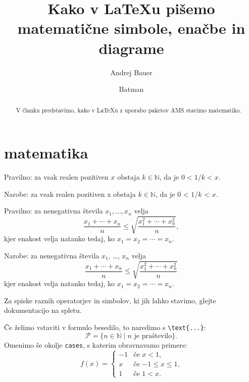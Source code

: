 \documentclass{amsart}
\title[Matematika v {\LaTeX}u]{Kako v {\LaTeX}u pišemo matematične simbole, enačbe in diagrame}
\author{Andrej Bauer}
\author{Batman}
\begin{document}
\maketitle

\begin{abstract}
  V članku predstavimo, kako v {\LaTeX}u z uporabo paketov AMS stavimo matematiko.
\end{abstract}

\section{matematika}

Pravilno: za vsak realen pozitiven $x$ obstaja $k \in \mathbb{N}$, da je $0 < 1/k < x$.

Narobe: za vsak realen pozitiven x obstaja $k \in \mathbb{N}$, da je $0$ < $1/k$ < $x$.


Pravilno: za nenegativna števila $x_1, \ldots, x_n$ velja
%
\[
  \frac{x_1 + \cdots + x_n}{n} \leq
  \sqrt{\frac{x_1^2 + \cdots + x_n^2}{n}},
\]
%
kjer enakost velja natanko tedaj, ko $x_1 = x_2 = \cdots = x_n$.

Narobe: za nenegativna števila $x_1$, \dots, $x_n$ velja
\[
  \frac{x_1 + \cdots + x_n}{n} \leq
  \sqrt{\frac{x_1^2 + \cdots + x_n^2}{n}}
\]
kjer enakost velja natanko tedaj, ko $x_1 = x_2 = \cdots = x_n$.

Za spiske raznih operatorjev in simbolov, ki jih lahko stavimo, glejte dokumentacijo na
spletu.

Če želimo vstaviti v formulo besedilo, to naredimo s \verb|\text{...}|:
%
\begin{equation*}
  \mathcal{P} = \{ n \in \mathbb{N} \mid \text{$n$ je praštevilo} \}.
\end{equation*}
%
Omenimo še okolje \texttt{cases}, s katerim obravnavamo primere:
%
\[
  f(x) =
  \begin{cases}
    -1 & \text{če $x < 1$,} \\
     x & \text{če $-1 \leq x \leq 1$,} \\
     1 & \text{če $1 < x$.}
  \end{cases}
\]
%
\end{document}
